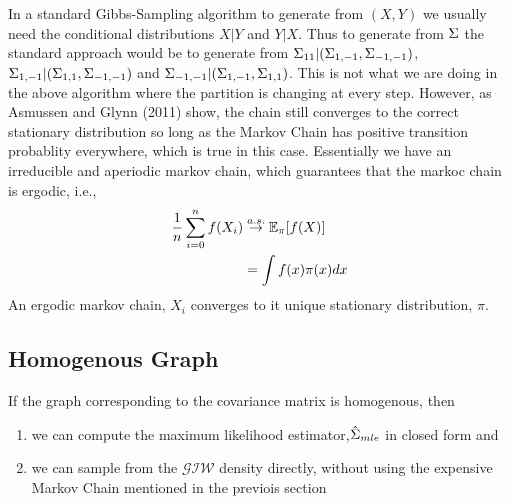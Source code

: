 \documentclass[12pt, leqno]{article}
\let\oldhat\hat
\renewcommand{\hat}[1]{\oldhat{{#1}}}
\def\s{\ensuremath\Sigma}
\def\E{\ensuremath\mathbb{E}}
\begin{document}
In a standard Gibbs-Sampling algorithm to generate from $(X,Y)$
we usually need the conditional distributions $X|Y$ and $Y|X$. Thus to
generate from $\s$ the standard approach would be to generate from
$\s_{11}|(\s_{1,-1},\s_{-1,-1})$, $\s_{1,-1}|(\s_{1,1},\s_{-1,-1})$
and $\s_{-1,-1}|(\s_{1,-1},\s_{1,1})$. This is not what we
are doing in the above algorithm where the partition is changing at
every step. However, as Asmussen and Glynn (2011)
show, the chain still converges to the correct stationary distribution
so long as the Markov Chain has positive transition  probablity
everywhere, which is true in this case. Essentially we have an
irreducible and aperiodic markov chain, which guarantees that the
markoc chain is
ergodic, i.e.,
\begin{align*}
\frac{1}{n} \sum_{i=0}^n f(X_i) &\overset{a.s.}{\to} \E_{\pi}[f(X)] \\ 
&= \int f(x) \pi(x) dx
\end{align*}
An ergodic markov chain, $X_i$ converges to it unique stationary
distribution, $\pi$. 

\subsection{Homogenous Graph}

If the graph corresponding to the covariance matrix is homogenous,
then 
\begin{enumerate}
\item we can compute the maximum likelihood estimator,$\hat{\s}_{mle}$
  in closed form and
\item we can sample from the $\mathcal{GIW}$ density directly, without
  using the expensive Markov Chain mentioned in the previois section
\end{enumerate}
\end{document}
